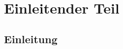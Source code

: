 \part{Einleitender Teil}
\label{part:EinleitenderTeil}

\chapter{Einleitung}
\label{chap:Einleitung}